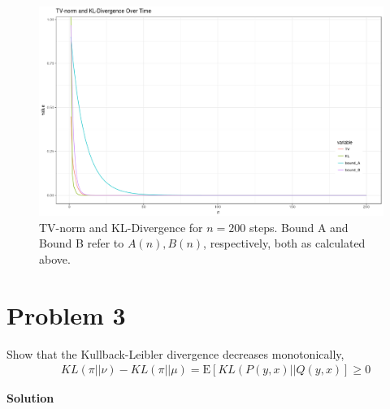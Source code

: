 \documentclass[5pt]{article}
\newcommand{\E}{\mathrm{E}}
\begin{document}
\begin{figure}[H]
\begin{center}
\includegraphics[width = 0.9\columnwidth]{q2_plot}
\caption{TV-norm and KL-Divergence for $n = 200$ steps. Bound A and Bound B refer to $A(n), B(n)$, respectively, both as calculated above.}
\end{center}
\end{figure}





\pagebreak

\section{Problem 3}
Show that the Kullback-Leibler divergence decreases monotonically,
\begin{align}
	& KL \left( \pi || \nu \right) - KL \left( \pi || \mu \right) = \E\left[
	KL \left( P \left( y, x \right) || Q\left( y, x \right) \right] \geq 0
\end{align}


\textbf{Solution} \\
\end{document}
